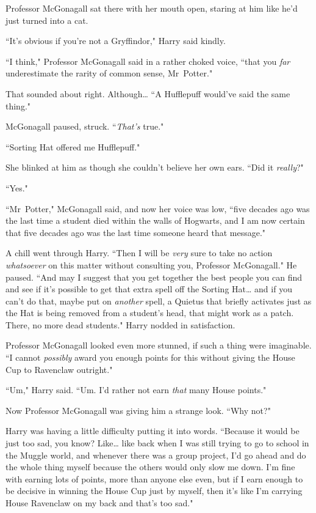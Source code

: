 Professor McGonagall sat there with her mouth open, staring at him like he'd just turned into a cat.

``It's obvious if you're not a Gryffindor," Harry said kindly.

``I think," Professor McGonagall said in a rather choked voice, ``that you \emph{far} underestimate the rarity of common sense, Mr~Potter."

That sounded about right. Although{\ldots} ``A Hufflepuff would've said the same thing."

McGonagall paused, struck. ``\emph{That's} true."

``Sorting Hat offered me Hufflepuff."

She blinked at him as though she couldn't believe her own ears. ``Did it \emph{really}?"

``Yes."

``Mr~Potter," McGonagall said, and now her voice was low, ``five decades ago was the last time a student died within the walls of Hogwarts, and I am now certain that five decades ago was the last time someone heard that message."

A chill went through Harry. ``Then I will be \emph{very} sure to take no action \emph{whatsoever} on this matter without consulting you, Professor McGonagall." He paused. ``And may I suggest that you get together the best people you can find and see if it's possible to get that extra spell off the Sorting Hat{\ldots} and if you can't do that, maybe put on \emph{another} spell, a Quietus that briefly activates just as the Hat is being removed from a student's head, that might work as a patch. There, no more dead students." Harry nodded in satisfaction.

Professor McGonagall looked even more stunned, if such a thing were imaginable. ``I cannot \emph{possibly} award you enough points for this without giving the House Cup to Ravenclaw outright."

``Um," Harry said. ``Um. I'd rather not earn \emph{that} many House points."

Now Professor McGonagall was giving him a strange look. ``Why not?"

Harry was having a little difficulty putting it into words. ``Because it would be just too sad, you know? Like{\ldots} like back when I was still trying to go to school in the Muggle world, and whenever there was a group project, I'd go ahead and do the whole thing myself because the others would only slow me down. I'm fine with earning lots of points, more than anyone else even, but if I earn enough to be decisive in winning the House Cup just by myself, then it's like I'm carrying House Ravenclaw on my back and that's too sad."

